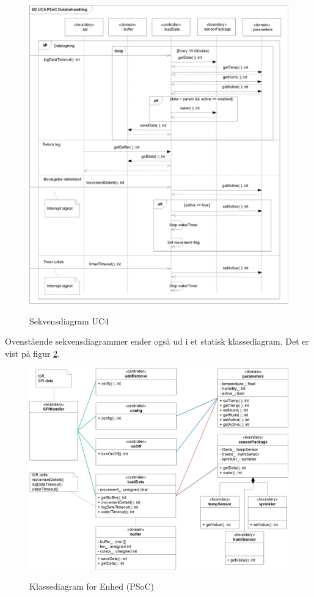 \begin{figure}[htbp] \centering
{\includegraphics[scale=0.8]{filer/design/a_psoc_uc4}}
\caption{Sekvensdiagram UC4}
\label{fig:psoc_sd_uc4}
\end{figure} 

\clearpage
Ovenstående sekvensdiagrammer ender også ud i et statisk klassediagram. Det er vist på figur \ref{fig:psoc_klassediagram}.

\begin{figure}[htbp] \centering
{\includegraphics[width=\textwidth]{filer/design/sw_class_psoc}}
\caption{Klassediagram for Enhed (PSoC)}
\label{fig:psoc_klassediagram}
\end{figure} 
